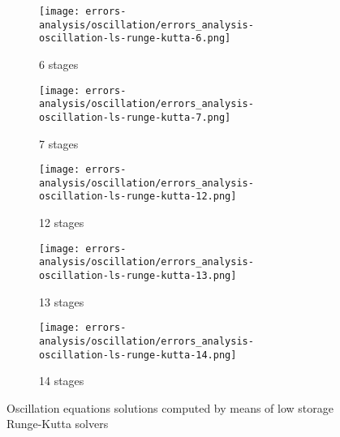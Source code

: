 \begin{figure}[!ht]
  \centering
  \begin{subfigure}[b]{0.45\textwidth}
    \centering
    \texttt{[image: errors-analysis/oscillation/errors\_analysis-oscillation-ls-runge-kutta-6.png]}
    \caption{6 stages}\label{fig:results-oscillation-ls-runge-kutta-6}
  \end{subfigure}\quad%
  \begin{subfigure}[b]{0.45\textwidth}
    \centering
    \texttt{[image: errors-analysis/oscillation/errors\_analysis-oscillation-ls-runge-kutta-7.png]}
    \caption{7 stages}\label{fig:results-oscillation-ls-runge-kutta-7}
  \end{subfigure}
  \begin{subfigure}[b]{0.45\textwidth}
    \centering
    \texttt{[image: errors-analysis/oscillation/errors\_analysis-oscillation-ls-runge-kutta-12.png]}
    \caption{12 stages}\label{fig:results-oscillation-ls-runge-kutta-12}
  \end{subfigure}\quad%
  \begin{subfigure}[b]{0.45\textwidth}
    \centering
    \texttt{[image: errors-analysis/oscillation/errors\_analysis-oscillation-ls-runge-kutta-13.png]}
    \caption{13 stages}\label{fig:results-oscillation-ls-runge-kutta-13}
  \end{subfigure}
  \begin{subfigure}[b]{0.45\textwidth}
    \centering
    \texttt{[image: errors-analysis/oscillation/errors\_analysis-oscillation-ls-runge-kutta-14.png]}
    \caption{14 stages}\label{fig:results-oscillation-ls-runge-kutta-14}
  \end{subfigure}\quad%
  \caption{Oscillation equations solutions computed by means of low storage Runge-Kutta solvers}\label{fig:results-oscillation-ls-runge-kutta-6-14}
\end{figure}

